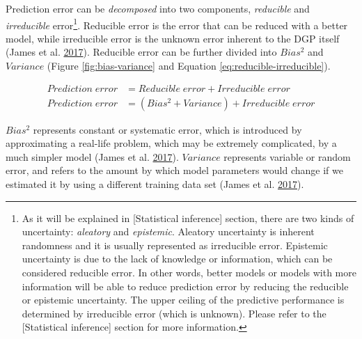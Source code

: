 \documentclass[
]{book}
\begin{document}
Prediction error can be \emph{decomposed} into two components, \emph{reducible} and \emph{irreducible} error\footnote{As it will be explained in {[}Statistical inference{]} section, there are two kinds of uncertainty: \emph{aleatory} and \emph{epistemic}. Aleatory uncertainty is inherent randomness and it is usually represented as irreducible error. Epistemic uncertainty is due to the lack of knowledge or information, which can be considered reducible error. In other words, better models or models with more information will be able to reduce prediction error by reducing the reducible or epistemic uncertainty. The upper ceiling of the predictive performance is determined by irreducible error (which is unknown). Please refer to the {[}Statistical inference{]} section for more information.}. Reducible error is the error that can be reduced with a better model, while irreducible error is the unknown error inherent to the DGP itself (James et al. \protect\hyperlink{ref-jamesIntroductionStatisticalLearning2017}{2017}). Reducible error can be further divided into \(Bias^2\) and \(Variance\) (Figure \ref{fig:bias-variance} and Equation \eqref{eq:reducible-irreducible}).

\begin{equation}
  \begin{split}
    Prediction \; error &= Reducible \; error + Irreducible \; error \\
    Prediction \; error &= (Bias^2 + Variance) + Irreducible \; error
  \end{split}
  \label{eq:reducible-irreducible}
\end{equation}

\(Bias^2\) represents constant or systematic error, which is introduced by approximating a real-life problem, which may be extremely complicated, by a much simpler model (James et al. \protect\hyperlink{ref-jamesIntroductionStatisticalLearning2017}{2017}). \(Variance\) represents variable or random error, and refers to the amount by which model parameters would change if we estimated it by using a different training data set (James et al. \protect\hyperlink{ref-jamesIntroductionStatisticalLearning2017}{2017}).
\end{document}
